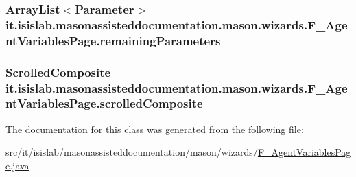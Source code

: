 \hypertarget{classit_1_1isislab_1_1masonassisteddocumentation_1_1mason_1_1wizards_1_1_f___agent_variables_page_a84c4e7c9e38a660e5befa94f5cac893f}{
\subsubsection[{remaining\-Parameters}]{\setlength{\rightskip}{0pt plus 5cm}Array\-List$<${\bf Parameter}$>$ it.\-isislab.\-masonassisteddocumentation.\-mason.\-wizards.\-F\-\_\-\-Agent\-Variables\-Page.\-remaining\-Parameters\hspace{0.3cm}{\ttfamily [private]}}}\label{classit_1_1isislab_1_1masonassisteddocumentation_1_1mason_1_1wizards_1_1_f___agent_variables_page_a84c4e7c9e38a660e5befa94f5cac893f}
\hypertarget{classit_1_1isislab_1_1masonassisteddocumentation_1_1mason_1_1wizards_1_1_f___agent_variables_page_af1e4ae0be128f9bae8b445938b59fd9c}{
\subsubsection[{scrolled\-Composite}]{\setlength{\rightskip}{0pt plus 5cm}Scrolled\-Composite it.\-isislab.\-masonassisteddocumentation.\-mason.\-wizards.\-F\-\_\-\-Agent\-Variables\-Page.\-scrolled\-Composite\hspace{0.3cm}{\ttfamily [private]}}}\label{classit_1_1isislab_1_1masonassisteddocumentation_1_1mason_1_1wizards_1_1_f___agent_variables_page_af1e4ae0be128f9bae8b445938b59fd9c}


The documentation for this class was generated from the following file\-:\begin{DoxyCompactItemize}
\item 
src/it/isislab/masonassisteddocumentation/mason/wizards/\hyperlink{_f___agent_variables_page_8java}{F\-\_\-\-Agent\-Variables\-Page.\-java}\end{DoxyCompactItemize}
